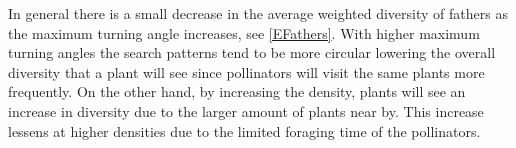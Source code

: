 In general there is a small decrease in the average weighted diversity of
fathers as the maximum turning angle increases, see \cref{EFathers}. With
higher maximum turning angles the search patterns tend to be more circular
lowering the overall diversity that a plant will see since pollinators will
visit the same plants more frequently.  On the other hand, by increasing the
density, plants will see an increase in diversity due to the larger amount of
plants near by.  This increase lessens at higher densities due to the limited
foraging time of the pollinators.
